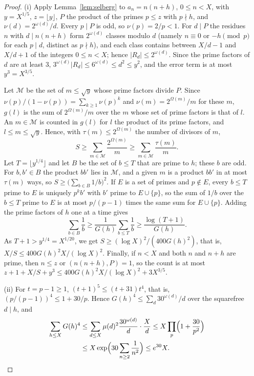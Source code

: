 \documentclass{aomart}
\numberwithin{equation}{section}
\theoremstyle{definition}
\begin{document}
\begin{proof}
(i) Apply Lemma~\ref{lem:selberg} to $a_n=n(n+h)$, $0\le n<X$, with $y=X^{1/5}$,
$z=\lfloor y\rfloor$, $P$ the product of the primes $p\le z$ with $p\nmid h$, and
$\nu(d)=2^{\omega(d)}/d$. Every $p\mid P$ is odd, so $\nu(p)=2/p<1$. For $d\mid P$ the residues $n$
with $d\mid n(n+h)$ form $2^{\omega(d)}$ classes modulo $d$ (namely $n\equiv0$ or $-h\pmod p$ for
each $p\mid d$, distinct as $p\nmid h$), and each class contains between $X/d-1$ and $X/d+1$ of
the integers $0\le n<X$; hence $|R_d|\le2^{\omega(d)}$. Since the prime factors of $d$ are at
least $3$, $3^{\omega(d)}|R_d|\le6^{\omega(d)}\le d^2\le y^2$, and the error term is at most
$y^3=X^{3/5}$.

Let $\mathcal M$ be the set of $m\le\sqrt y$ whose prime factors divide $P$. Since
$\nu(p)/(1-\nu(p))=\sum_{k\ge1}\nu(p)^k$ and $\nu(m)=2^{\Omega(m)}/m$ for these $m$, $g(l)$ is the
sum of $2^{\Omega(m)}/m$ over the $m$ whose set of prime factors is that of $l$. An $m\in\mathcal M$
is counted in $g(l)$ for $l$ the product of its prime factors, and $l\le m\le\sqrt y$. Hence,
with $\tau(m)\le2^{\Omega(m)}$ the number of divisors of $m$,
\[
  S\ge\sum_{m\in\mathcal M}\frac{2^{\Omega(m)}}m\ge\sum_{m\in\mathcal M}\frac{\tau(m)}m.
\]
Let $T=\lfloor y^{1/4}\rfloor$ and let $B$ be
the set of $b\le T$ that are prime to $h$; these $b$ are odd. For $b,b'\in B$ the product $bb'$
lies in $\mathcal M$, and a given $m$ is a product $bb'$ in at most $\tau(m)$ ways, so
$S\ge\bigl(\sum_{b\in B}1/b\bigr)^2$. If $E$ is a set of primes and $p\notin E$, every $b\le T$
prime to $E$ is uniquely $p^kb'$ with $b'$ prime to $E\cup\{p\}$, so the sum of $1/b$ over the
$b\le T$ prime to $E$ is at most $p/(p-1)$ times the same sum for $E\cup\{p\}$. Adding the prime
factors of $h$ one at a time gives
\[
  \sum_{b\in B}\frac1b\ge\frac1{G(h)}\sum_{b\le T}\frac1b\ge\frac{\log(T+1)}{G(h)}.
\]
As $T+1>y^{1/4}=X^{1/20}$, we get $S\ge(\log X)^2/(400G(h)^2)$, that is,
$X/S\le400G(h)^2X/(\log X)^2$. Finally, if $n<X$ and both $n$ and $n+h$ are prime, then
$n\le z$ or $(n(n+h),P)=1$, so the count is at most $z+1+X/S+y^3\le400G(h)^2X/(\log X)^2+3X^{3/5}$.

(ii) For $t=p-1\ge1$, $(t+1)^5\le(t+31)t^4$, that is, $(p/(p-1))^4\le1+30/p$. Hence
$G(h)^4\le\sum_d30^{\omega(d)}/d$ over the squarefree $d\mid h$, and
\begin{align*}
  \sum_{h\le X}G(h)^4&\le\sum_{d\le X}\mu(d)^2\frac{30^{\omega(d)}}d\cdot\frac Xd
  \le X\prod_p\Bigl(1+\frac{30}{p^2}\Bigr)\\
  &\le X\exp\Bigl(30\sum_{n\ge2}\frac1{n^2}\Bigr)\le e^{30}X.\qedhere
\end{align*}
\end{proof}
\end{document}
